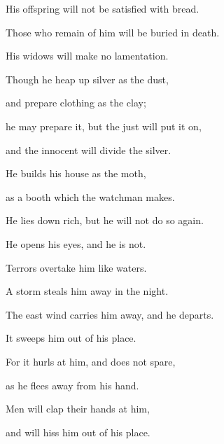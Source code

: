 {\par }{\QB His offspring will not be satisfied with bread.
\par }{\Q {}Those who remain of him will be buried in death.
\par }{\QB His widows will make no lamentation.
\par }{\Q {}Though he heap up silver as the dust,
\par }{\QB and prepare clothing as the clay;
\par }{\Q {}he may prepare it, but the just will put it on,
\par }{\QB and the innocent will divide the silver.
\par }{\Q {}He builds his house as the moth,
\par }{\QB as a booth which the watchman makes.
\par }{\Q {}He lies down rich, but he will not do so again.
\par }{\QB He opens his eyes, and he is not.
\par }{\Q {}Terrors overtake him like waters.
\par }{\QB A storm steals him away in the night.
\par }{\Q {}The east wind carries him away, and he departs.
\par }{\QB It sweeps him out of his place.
\par }{\Q {}For it hurls at him, and does not spare,
\par }{\QB as he flees away from his hand.
\par }{\Q {}Men will clap their hands at him,
\par }{\QB and will hiss him out of his place.
\par }{\BB \par }
